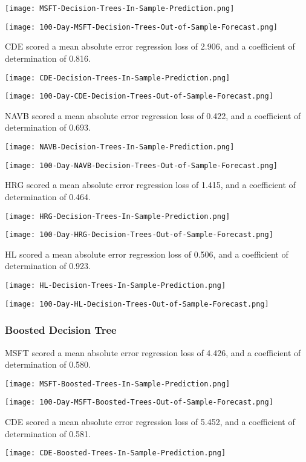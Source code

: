 \texttt{[image: MSFT-Decision-Trees-In-Sample-Prediction.png]}

\texttt{[image: 100-Day-MSFT-Decision-Trees-Out-of-Sample-Forecast.png]}

CDE scored a mean absolute error regression loss of 2.906, and a coefficient of determination of 0.816.

\texttt{[image: CDE-Decision-Trees-In-Sample-Prediction.png]}

\texttt{[image: 100-Day-CDE-Decision-Trees-Out-of-Sample-Forecast.png]}

NAVB scored a mean absolute error regression loss of 0.422, and a coefficient of determination of 0.693.

\texttt{[image: NAVB-Decision-Trees-In-Sample-Prediction.png]}

\texttt{[image: 100-Day-NAVB-Decision-Trees-Out-of-Sample-Forecast.png]}

HRG scored a mean absolute error regression loss of 1.415, and a coefficient of determination of 0.464.

\texttt{[image: HRG-Decision-Trees-In-Sample-Prediction.png]}

\texttt{[image: 100-Day-HRG-Decision-Trees-Out-of-Sample-Forecast.png]}

HL scored a mean absolute error regression loss of 0.506, and a coefficient of determination of 0.923.

\texttt{[image: HL-Decision-Trees-In-Sample-Prediction.png]}

\texttt{[image: 100-Day-HL-Decision-Trees-Out-of-Sample-Forecast.png]}

\subsubsection{Boosted Decision Tree}
MSFT scored a mean absolute error regression loss of 4.426, and a coefficient of determination of 0.580.

\texttt{[image: MSFT-Boosted-Trees-In-Sample-Prediction.png]}

\texttt{[image: 100-Day-MSFT-Boosted-Trees-Out-of-Sample-Forecast.png]}

CDE scored a mean absolute error regression loss of 5.452, and a coefficient of determination of 0.581.

\texttt{[image: CDE-Boosted-Trees-In-Sample-Prediction.png]}

